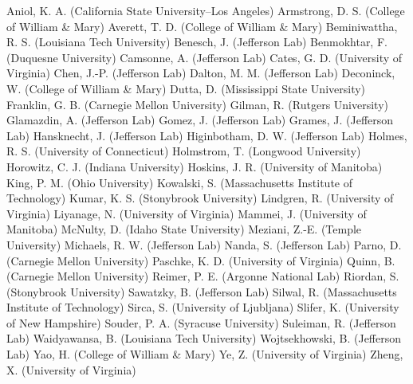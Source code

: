 Aniol, K. A. (California State University--Los Angeles)
Armstrong, D. S. (College of William \& Mary)
Averett, T. D. (College of William \& Mary)
Beminiwattha, R. S. (Louisiana Tech University)
Benesch, J. (Jefferson Lab)
Benmokhtar, F. (Duquesne University)
Camsonne, A. (Jefferson Lab)
Cates, G. D. (University of Virginia)
Chen, J.-P. (Jefferson Lab)
Dalton, M. M. (Jefferson Lab)
Deconinck, W. (College of William \& Mary)
Dutta, D. (Mississippi State University)
Franklin, G. B. (Carnegie Mellon University)
Gilman, R. (Rutgers University)
Glamazdin, A. (Jefferson Lab)
Gomez, J. (Jefferson Lab)
Grames, J. (Jefferson Lab)
Hansknecht, J. (Jefferson Lab)
Higinbotham, D. W. (Jefferson Lab)
Holmes, R. S. (University of Connecticut)
Holmstrom, T. (Longwood University)
Horowitz, C. J. (Indiana University)
Hoskins, J. R. (University of Manitoba)
King, P. M. (Ohio University)
Kowalski, S. (Massachusetts Institute of Technology)
Kumar, K. S. (Stonybrook University)
Lindgren, R. (University of Virginia)
Liyanage, N. (University of Virginia)
Mammei, J. (University of Manitoba)
McNulty, D. (Idaho State University)
Meziani, Z.-E. (Temple University)
Michaels, R. W. (Jefferson Lab)
Nanda, S. (Jefferson Lab)
Parno, D. (Carnegie Mellon University)
Paschke, K. D. (University of Virginia)
Quinn, B. (Carnegie Mellon University)
Reimer, P. E. (Argonne National Lab)
Riordan, S. (Stonybrook University)
Sawatzky, B. (Jefferson Lab)
Silwal, R. (Massachusetts Institute of Technology)
Sirca, S. (University of Ljubljana)
Slifer, K. (University of New Hampshire)
Souder, P. A. (Syracuse University)
Suleiman, R. (Jefferson Lab)
Waidyawansa, B. (Louisiana Tech University)
Wojtsekhowski, B. (Jefferson Lab)
Yao, H. (College of William \& Mary)
Ye, Z. (University of Virginia)
Zheng, X. (University of Virginia)
